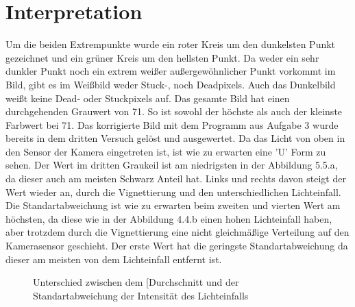\documentclass[12pt, oneside, a4paper, \docLanguage]{report}
\begin{document}
\section{Interpretation}
\label{chap:VERSUCH_4_INTERPRETATION}
Um die beiden Extrempunkte wurde ein roter Kreis um den dunkelsten Punkt gezeichnet und ein grüner Kreis um den hellsten Punkt.
Da weder ein sehr dunkler Punkt noch ein extrem weißer außergewöhnlicher Punkt vorkommt im Bild, gibt es im Weißbild weder Stuck-, noch Deadpixels.
Auch das Dunkelbild weißt keine Dead- oder Stuckpixels auf.
Das gesamte Bild hat einen durchgehenden Grauwert von 71.
So ist sowohl der höchste als auch der kleinste Farbwert bei 71.
\newline
\newline
Das korrigierte Bild mit dem Programm aus Aufgabe 3 wurde bereits in dem dritten Versuch gelöst und ausgewertet.
\newline
\newline
Da das Licht von oben in den Sensor der Kamera eingetreten ist, ist wie zu erwarten eine 'U' Form zu sehen.
Der Wert im dritten Graukeil ist am niedrigsten in der Abbildung 5.5.a, da dieser auch am meisten Schwarz Anteil hat.
Links und rechts davon steigt der Wert wieder an, durch die Vignettierung und den unterschiedlichen Lichteinfall. 
Die Standartabweichung ist wie zu erwarten beim zweiten und vierten Wert am höchsten, da diese wie in der Abbildung 4.4.b einen hohen Lichteinfall haben, aber trotzdem durch die Vignettierung eine nicht gleichmäßige Verteilung auf den Kamerasensor geschieht.
Der erste Wert hat die geringste Standartabweichung da dieser am meisten von dem Lichteinfall entfernt ist. 
\begin{figure}[hbt!]
  	\centering
	\hfill
	\caption{Unterschied zwischen dem [Durchschnitt und der Standartabweichung der Intensität des Lichteinfalls}
\end{figure}
\end{document}
